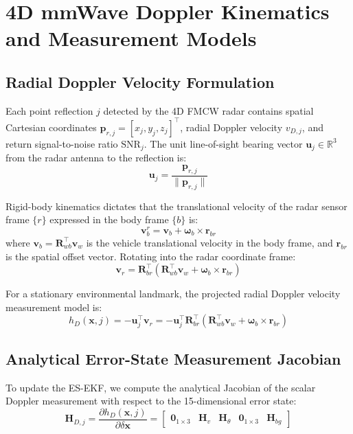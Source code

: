 \documentclass[lettersize,journal]{IEEEtran}
\begin{document}
\section{4D mmWave Doppler Kinematics and Measurement Models}

\subsection{Radial Doppler Velocity Formulation}
Each point reflection $j$ detected by the 4D FMCW radar contains spatial Cartesian coordinates $\mathbf{p}_{r, j} = [x_j, y_j, z_j]^\top$, radial Doppler velocity $v_{D, j}$, and return signal-to-noise ratio $\mathrm{SNR}_j$. 
The unit line-of-sight bearing vector $\mathbf{u}_j \in \mathbb{R}^3$ from the radar antenna to the reflection is:
\begin{equation}
\mathbf{u}_j = \frac{\mathbf{p}_{r, j}}{\|\mathbf{p}_{r, j}\|}
\end{equation}

Rigid-body kinematics dictates that the translational velocity of the radar sensor frame $\{r\}$ expressed in the body frame $\{b\}$ is:
\begin{equation}
\mathbf{v}_b^r = \mathbf{v}_b + \boldsymbol{\omega}_b \times \mathbf{r}_{br}
\end{equation}
where $\mathbf{v}_b = \mathbf{R}_{wb}^\top \mathbf{v}_w$ is the vehicle translational velocity in the body frame, and $\mathbf{r}_{br}$ is the spatial offset vector. 
Rotating into the radar coordinate frame:
\begin{equation}
\mathbf{v}_r = \mathbf{R}_{br}^\top (\mathbf{R}_{wb}^\top \mathbf{v}_w + \boldsymbol{\omega}_b \times \mathbf{r}_{br})
\end{equation}

For a stationary environmental landmark, the projected radial Doppler velocity measurement model is:
\begin{equation}
h_D(\mathbf{x}, j) = - \mathbf{u}_j^\top \mathbf{v}_r = - \mathbf{u}_j^\top \mathbf{R}_{br}^\top (\mathbf{R}_{wb}^\top \mathbf{v}_w + \boldsymbol{\omega}_b \times \mathbf{r}_{br})
\end{equation}

\subsection{Analytical Error-State Measurement Jacobian}
To update the ES-EKF, we compute the analytical Jacobian of the scalar Doppler measurement with respect to the 15-dimensional error state:
\begin{equation}
\mathbf{H}_{D, j} = \frac{\partial h_D(\mathbf{x}, j)}{\partial \delta \mathbf{x}} = \begin{bmatrix} \mathbf{0}_{1 \times 3} & \mathbf{H}_v & \mathbf{H}_\theta & \mathbf{0}_{1 \times 3} & \mathbf{H}_{bg} \end{bmatrix}
\end{equation}
\end{document}
